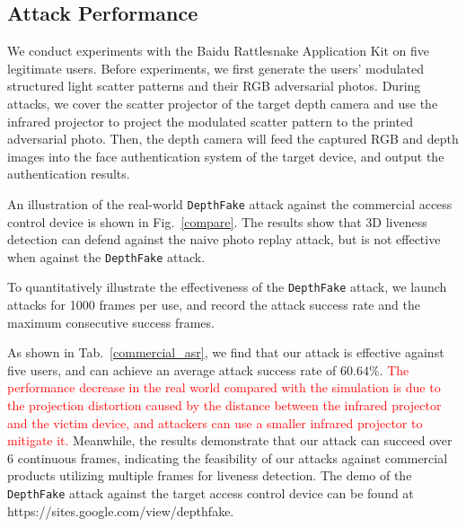 
\subsection{Attack Performance}
We conduct experiments with the Baidu Rattlesnake Application Kit on five legitimate users.
Before experiments, we first generate the users' modulated structured light scatter patterns and their RGB adversarial photos.
During attacks, we cover the scatter projector of the target depth camera and use the infrared projector to project the modulated scatter pattern to the printed adversarial photo. Then, the depth camera will feed the captured RGB and depth images into the face authentication system of the target device, and output the authentication results.

An illustration of the real-world \texttt{DepthFake} attack against the commercial access control device is shown in Fig.~\ref{compare}. The results show that 3D liveness detection can defend against the naive photo replay attack, but is not effective when against the \texttt{DepthFake} attack. 

To quantitatively illustrate the effectiveness of the \texttt{DepthFake} attack,  we launch attacks for 1000 frames per use, and record the attack success rate and the maximum consecutive success frames.

As shown in Tab.~\ref{commercial_asr}, we find that our attack is effective against five users, and can achieve an average attack success rate of $60.64\%$. 
\textcolor{red}{The performance decrease in the real world compared with the simulation is due to the projection distortion caused by the distance between the infrared projector and the victim device, and attackers can use a smaller infrared projector to mitigate it.}
Meanwhile, the results demonstrate that our attack can succeed over 6 continuous frames, indicating the feasibility of our attacks against commercial products utilizing multiple frames for liveness detection.  The demo of the  \texttt{DepthFake} attack against the target access control device can be found at https://sites.google.com/view/depthfake.

